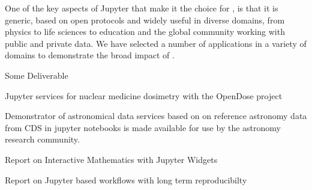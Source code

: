 \begin{workpackage}
\begin{wpdescription}
  One of the key aspects of Jupyter that make it the choice for
  \TheProject, is that it is generic, based on open protocols and
  widely useful in diverse domains, from physics to life sciences to
  education and the global community working with public and private
  data. We have selected a number of applications in a variety of domains
  to demonstrate the broad impact of \TheProject.

\end{wpdescription}

\begin{tasklist}
% 






\end{tasklist}



\begin{wpdelivs}
\begin{wpdeliv}[due=1,miles=startup,id=infrastructure,dissem=PU,nature=DEC,lead=SRL]
  {Some Deliverable}
\end{wpdeliv}
\begin{wpdeliv}[due=1,miles=startup,id=opendose-analysis,dissem=PU,nature=DEM,lead=INSERM]
  {Jupyter services for nuclear medicine dosimetry with the OpenDose project}
\end{wpdeliv}
\begin{wpdeliv}[due=40,miles=final,id=application-astro,dissem=PU,nature=DEM,lead=CDS]
    {Demonstrator of astronomical data services based on on reference astronomy data from CDS in jupyter notebooks is made available for use by the astronomy research community.}
\end{wpdeliv}
\begin{wpdeliv}[due=36,miles=final,id=math,dissem=PU,nature=R,lead=UPSUD]
  {Report on Interactive Mathematics with Jupyter Widgets}
\end{wpdeliv}
\begin{wpdeliv}[due=48,miles=final,id=xfel-workflows,dissem=PU,nature=R,lead=XFEL]
  {Report on Jupyter based workflows with long term reproducibilty}
\end{wpdeliv}

\end{wpdelivs}
\end{workpackage}

